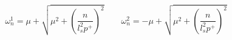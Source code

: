 \begin{equation}
\omega^1_n =  \mu + \sqrt{\mu^2 + \left( \frac{n}{l_s^2 p^+} \right)^2 }  \qquad
\omega^2_n = -\mu + \sqrt{\mu^2 + \left( \frac{n}{l_s^2 p^+} \right)^2 }  
\end{equation}

